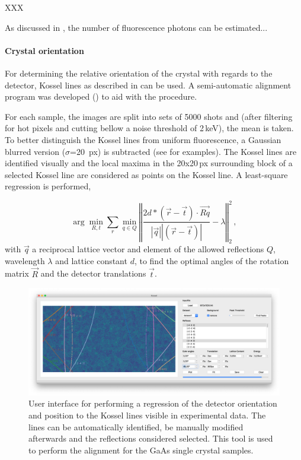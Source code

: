 XXX


As discussed in , the number of fluorescence photons can be estimated...




\paragraph{Crystal orientation}
For determining the relative orientation of the crystal with regards to the detector, Kossel lines as described in  can be used.  A semi-automatic alignment program was developed () to aid with the procedure.

For each sample, the images are split into sets of 5000 shots and (after filtering for hot pixels and cutting bellow a noise threshold of 2\,keV), the mean is taken. To better distinguish the Kossel lines from uniform fluorescence, a Gaussian blurred version ($\sigma$=20\, px) is subtracted (see  for examples). The Kossel lines are identified visually and the local maxima in the 20x20\,px surrounding block of a selected Kossel line are considered as points on the Kossel line. A least-square regression is performed,

\begin{equation}
	\arg\!\min_{R,t} \sum_{r} \min_{q\in Q} \left\Vert \frac{2 d * \left( \vec{r} - \vec{t} \right) \cdot \vec{Rq}}{\left|\vec{q}\right| \left| \left(\vec{r}-\vec{t}\right)\right|} -\lambda \right\Vert_2^2 \,,
\end{equation}
with
$\vec{q}$ a reciprocal lattice vector and element of the allowed reflections $Q$, wavelength $\lambda$ and lattice constant $d$, to find
 the optimal angles of the rotation matrix $\vec{R}$ and the detector translations $\vec{t}$.
 


\begin{figure}
	\centering
	\includegraphics[width=0.8\linewidth]{images/kosselfit.png}
	\caption[User Interface for Kossel line based alignment]{User interface for performing a regression of the detector orientation and position to the Kossel lines visible in experimental data. The lines can be automatically identified,  be  manually modified afterwards and the reflections considered selected. This tool is used to perform the alignment for the GaAs single crystal samples.}
	\label{fig:kosselfit}
\end{figure}





